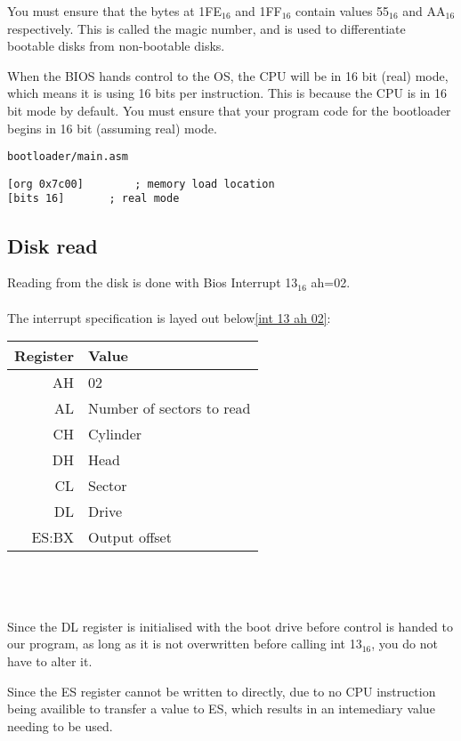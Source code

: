 \documentclass{article}
\begin{document}
You must ensure that the bytes at 1FE$_{16}$ and 1FF$_{16}$
contain values 55$_{16}$ and AA$_{16}$ respectively\cite{55aa}.
This is called the magic number, and is used to differentiate
bootable disks from non-bootable disks.

When the BIOS hands control to the OS, the CPU will be in 16 bit (real) mode\cite{16bitstart},
which means it is using 16 bits per instruction. This is because the CPU is in
16 bit mode by default. You must ensure that your program code for the bootloader
begins in 16 bit (assuming real) mode.

\begin{verbatim}
bootloader/main.asm
\end{verbatim}
\begin{verbatim}
[org 0x7c00]		; memory load location
[bits 16]		; real mode
\end{verbatim}

\subsection{Disk read}

Reading from the disk is done with Bios Interrupt 13$_{16}$ ah=02\cite{int 13h}.
\\\\
The interrupt specification is layed out below\ref{int 13 ah 02}:
\\

\begin{tabular}{|r|l|}
	\hline
	\textbf{Register} & \textbf{Value} \\
	\hline
	AH & 02 \\
	\hline
	AL & Number of sectors to read \\
	\hline
	CH & Cylinder \\
	\hline
	DH & Head \\
	\hline
	CL & Sector \\
	\hline
	DL & Drive \\
	\hline
	ES:BX & Output offset \\
	\hline
\end{tabular}
\\\\\\
Since the DL register is initialised with the boot drive before control
is handed to our program\cite{boot drive init}, as long as it is not
overwritten before calling int 13$_{16}$, you do not have to alter it.

Since the ES register cannot be written to directly, due to no CPU instruction
being availible to transfer a value to ES\cite{segment cpu write instruction},
which results in an intemediary value needing to be used.
\end{document}
